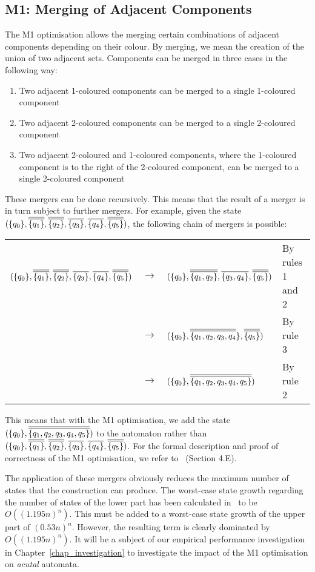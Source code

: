 \subsection{M1: Merging of Adjacent Components}
The M1 optimisation allows the merging certain combinations of adjacent components depending on their colour. By merging, we mean the creation of the union of two adjacent sets. Components can be merged in three cases in the following way:

\begin{enumerate}
\item Two adjacent 1-coloured components can be merged to a single 1-coloured component
\item Two adjacent 2-coloured components can be merged to a single 2-coloured component
\item Two adjacent 2-coloured and 1-coloured components, where the 1-coloured component is to the right of the 2-coloured component, can be merged to a single 2-coloured component
\end{enumerate}

These mergers can be done recursively. This means that the result of a merger is in turn subject to further mergers. For example, given the state $(\qm0, \cl2{\qm1}, \cl2{\qm2}, \cl1{\qm3}, \cl1{\qm4}, \cl2{\qm5})$, the following chain of mergers is possible:

{\renewcommand{\arraystretch}{1.7}
\begin{tabular}{llll}
$(\qm0, \cl2{\qm1}, \cl2{\qm2}, \cl1{\qm3}, \cl1{\qm4}, \cl2{\qm5})$ & $\longrightarrow$ & $(\qm0, \cl2{\{q_1,q_2\}}, \cl1{\{q_3,q_4\}}, \cl2{\qm5})$ &
By rules 1 and 2 \\
& $\longrightarrow$  & $(\qm0, \cl2{\{q_1,q_2,q_3,q_4}\}, \cl2{\qm5})$ &
By rule 3 \\
& $\longrightarrow$ & $(\qm0, \cl2{\{q_1, q_2, q_3, q_4, q_5\}})$ &
By rule 2
\end{tabular}}

This means that with the M1 optimisation, we add the state $(\qm0, \cl2{\{q_1, q_2, q_3, q_4, q_5\}})$ to the automaton rather than $(\qm0, \cl2{\qm1}, \cl2{\qm2}, \cl1{\qm3}, \cl1{\qm4}, \cl2{\qm5})$. For the formal description and proof of correctness of the M1 optimisation, we refer to~\cite{2014_joel_ulrich} (Section 4.E).

The application of these mergers obviously reduces the maximum number of states that the construction can produce. The worst-case state growth regarding the number of states of the lower part has been calculated in~\cite{2014_joel_ulrich} to be $O((1.195n)^n)$. This must be added to a worst-case state growth of the upper part of $(0.53n)^n$. However, the resulting term is clearly dominated by $O((1.195n)^n)$. It will be a subject of our empirical performance investigation in Chapter~\ref{chap_investigation} to investigate the impact of the M1 optimisation on \textit{acutal} automata.


